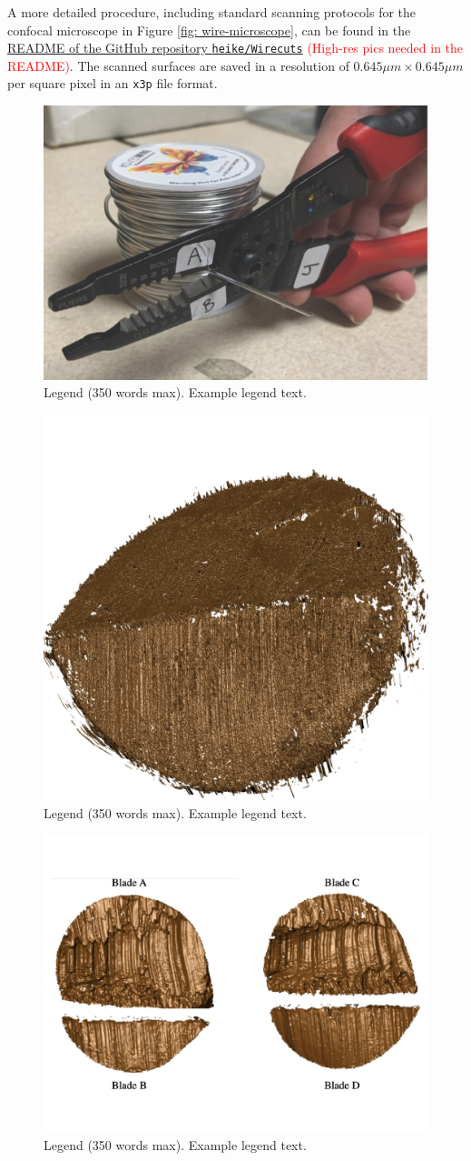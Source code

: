 \documentclass[fleqn,10pt]{wlscirep}
\begin{document}
A more detailed procedure, including standard scanning protocols for the
confocal microscope in Figure \ref{fig: wire-microscope}, can be found
in the
\href{https://github.com/heike/Wirecuts/blob/main/README.md}{README of the GitHub repository \texttt{heike/Wirecuts}}
\textcolor{red}{(High-res pics needed in the README)}. The scanned
surfaces are saved in a resolution of \(0.645 \mu m \times 0.645 \mu m\)
per square pixel in an \texttt{x3p} file format.

\begin{figure}[ht]
\centering
\includegraphics[width=0.5\linewidth]{kaiweet-label.jpg}
\caption{Legend (350 words max). Example legend text.}
\label{fig: kaiweet-label}
\end{figure}

\begin{figure}[ht]
\centering
\includegraphics[width=0.25\linewidth]{x3p_tent.png}
\caption{Legend (350 words max). Example legend text.}
\label{fig: x3p_tent}
\end{figure}

\begin{figure}[ht]
\centering
\includegraphics[width=0.5\linewidth]{T1W.pdf}
\caption{Legend (350 words max). Example legend text.}
\label{fig: T1W}
\end{figure}
\end{document}
